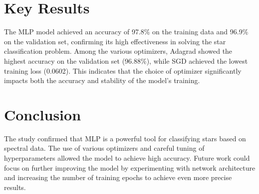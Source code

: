 \documentclass[journal,onecolumn]{IEEEtran}
\begin{document}
\section{Key Results}
The MLP model achieved an accuracy of 97.8\% on the training data and 96.9\% on the validation set, confirming its high effectiveness in solving the star classification problem. Among the various optimizers, Adagrad showed the highest accuracy on the validation set (96.88\%), while SGD achieved the lowest training loss (0.0602). This indicates that the choice of optimizer significantly impacts both the accuracy and stability of the model's training.


\section{Conclusion}
The study confirmed that MLP is a powerful tool for classifying stars based on spectral data. The use of various optimizers and careful tuning of hyperparameters allowed the model to achieve high accuracy. Future work could focus on further improving the model by experimenting with network architecture and increasing the number of training epochs to achieve even more precise results. 






 \cite{soliman2023mlp}









%
%
%
\end{document}
